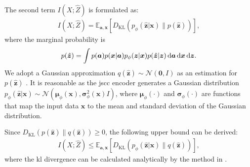 The second term $I(X;\hat{Z})$ \cite{Shao_2022_LTO} is formulated as:
\begin{align}
I(X;\hat{Z})=\mathbb{E}_{\bm{a},\bm{x}}\left[D_{\text{KL}}(p_{\phi}(\hat{\bm{z}} | \bm{x}) \| p(\hat{\bm{z}})) \right],
\end{align}
where the marginal probability is 
\begin{align}
    p(\hat{\bm{z}})=\int p(\bm{a})p(\bm{x}|\bm{a})p_{\phi}(\bm{z}|\bm{x})p(\hat{\bm{z}}|\bm{z}) \mathop{}\!\mathrm{d}\bm{a}\mathop{}\!\mathrm{d}\bm{x}\mathop{}\!\mathrm{d}\bm{z}.
\end{align}
We adopt a Gaussian approximation $q(\hat{\bm{z}}) \sim \mathcal{N}(\bm{0}, I)$ as an estimation for $p(\hat{\bm{z}})$ \cite{Kingma_2013_Aev}. It is reasonable as the \gls{jscc} encoder generates a Gaussian distribution $p_{\phi}(\hat{\bm{z}}|\bm{x}) \sim \mathcal{N}(\bm{\mu}_{\phi}(\bm{x}), \bm{\sigma}_{\phi}^2(\bm{x})I)$, where $\bm{\mu}_{\phi}(\cdot)$ and $\bm{\sigma}_{\phi}(\cdot)$ are functions that map the input data $\bm{x}$ to the mean and standard deviation of the Gaussian distribution.

Since $D_{\text{KL}}(p(\hat{\bm{z}})\parallel q(\hat{\bm{z}})) \geq 0$, the following upper bound can be derived:
\begin{align}
    I(X;\hat{Z}) \leq \mathbb{E}_{\bm{a},\bm{x}}\left[D_{\text{KL}}(p_{\phi}(\hat{\bm{z}} | \bm{x}) \| q(\hat{\bm{z}})) \right],
\end{align}
where the \gls{kl} divergence can be calculated analytically by the method in \cite{Duchi_2007_DfL}.

